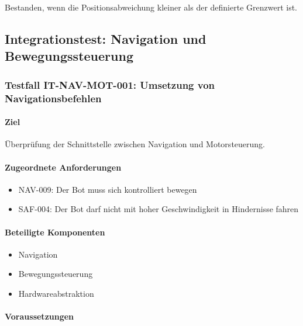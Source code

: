 \documentclass[
  a4paper,
  12pt,
  DIV=12,        %
  parskip=half,  %
  headings=small %
]{scrartcl}
\theoremstyle{definition}
\providecommand{\tightlist}{%
  \setlength{\itemsep}{0pt}\setlength{\parskip}{0pt}}
\theoremstyle{definition}
\begin{document}
Bestanden, wenn die Positionsabweichung kleiner als der definierte
Grenzwert ist.

\subsection{Integrationstest: Navigation und
Bewegungssteuerung}\label{integrationstest-navigation-und-bewegungssteuerung}

\subsubsection{Testfall IT-NAV-MOT-001: Umsetzung von
Navigationsbefehlen}\label{testfall-it-nav-mot-001-umsetzung-von-navigationsbefehlen}

\paragraph{Ziel}\label{ziel-11}

Überprüfung der Schnittstelle zwischen Navigation und Motorsteuerung.

\paragraph{Zugeordnete
Anforderungen}\label{zugeordnete-anforderungen-11}

\begin{itemize}
\tightlist
\item
  NAV-009: Der Bot muss sich kontrolliert bewegen
\item
  SAF-004: Der Bot darf nicht mit hoher Geschwindigkeit in Hindernisse
  fahren
\end{itemize}

\paragraph{Beteiligte Komponenten}\label{beteiligte-komponenten-2}

\begin{itemize}
\tightlist
\item
  Navigation
\item
  Bewegungssteuerung
\item
  Hardwareabstraktion
\end{itemize}

\paragraph{Voraussetzungen}\label{voraussetzungen-11}
\end{document}
